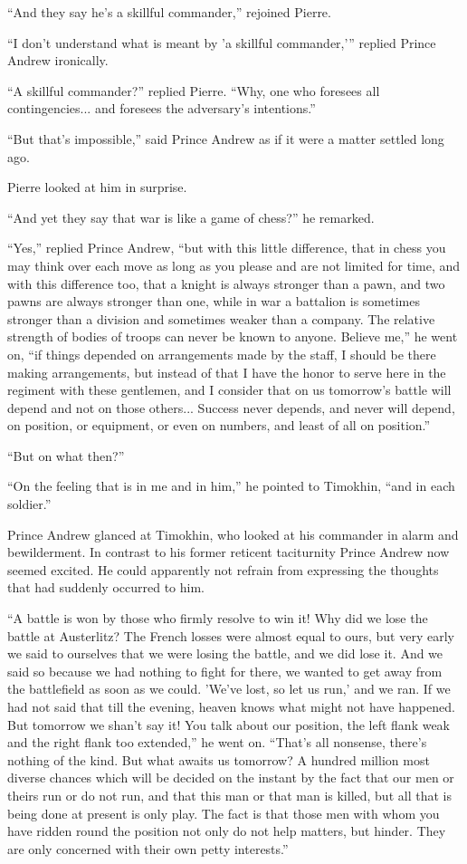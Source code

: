``And they say he's a skillful commander,'' rejoined Pierre.

``I don't understand what is meant by 'a skillful commander,'{}''
replied Prince Andrew ironically.

``A skillful commander?'' replied Pierre. ``Why, one who foresees
all contingencies... and foresees the adversary's intentions.''

``But that's impossible,'' said Prince Andrew as if it were a
matter settled long ago.

Pierre looked at him in surprise.

``And yet they say that war is like a game of chess?'' he
remarked.

``Yes,'' replied Prince Andrew, ``but with this little
difference, that in chess you may think over each move as long as
you please and are not limited for time, and with this difference
too, that a knight is always stronger than a pawn, and two pawns
are always stronger than one, while in war a battalion is
sometimes stronger than a division and sometimes weaker than a
company. The relative strength of bodies of troops can never be
known to anyone. Believe me,'' he went on, ``if things depended
on arrangements made by the staff, I should be there making
arrangements, but instead of that I have the honor to serve here
in the regiment with these gentlemen, and I consider that on us
tomorrow's battle will depend and not on those others... Success
never depends, and never will depend, on position, or equipment,
or even on numbers, and least of all on position.''

``But on what then?''

``On the feeling that is in me and in him,'' he pointed to
Timokhin, ``and in each soldier.''

Prince Andrew glanced at Timokhin, who looked at his commander in
alarm and bewilderment. In contrast to his former reticent
taciturnity Prince Andrew now seemed excited. He could apparently
not refrain from expressing the thoughts that had suddenly
occurred to him.

``A battle is won by those who firmly resolve to win it! Why did
we lose the battle at Austerlitz? The French losses were almost
equal to ours, but very early we said to ourselves that we were
losing the battle, and we did lose it. And we said so because we
had nothing to fight for there, we wanted to get away from the
battlefield as soon as we could.  'We've lost, so let us run,'
and we ran. If we had not said that till the evening, heaven
knows what might not have happened. But tomorrow we shan't say
it! You talk about our position, the left flank weak and the
right flank too extended,'' he went on. ``That's all nonsense,
there's nothing of the kind. But what awaits us tomorrow? A
hundred million most diverse chances which will be decided on the
instant by the fact that our men or theirs run or do not run, and
that this man or that man is killed, but all that is being done
at present is only play. The fact is that those men with whom you
have ridden round the position not only do not help matters, but
hinder. They are only concerned with their own petty interests.''

